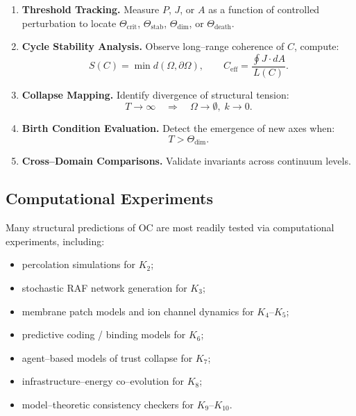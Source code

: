 \begin{enumerate}
    \item \textbf{Threshold Tracking.}
          Measure $P$, $J$, or $A$ as a function of controlled perturbation to
          locate $\Theta_{\mathrm{crit}}$, $\Theta_{\mathrm{stab}}$,
          $\Theta_{\mathrm{dim}}$, or $\Theta_{\mathrm{death}}$.

    \item \textbf{Cycle Stability Analysis.}
          Observe long–range coherence of $C$, compute:
          \[
             S(C)=\min d(\Omega,\partial\Omega),\qquad
             C_{\mathrm{eff}}=\frac{\oint J\cdot dA}{L(C)}.
          \]

    \item \textbf{Collapse Mapping.}
          Identify divergence of structural tension:
          \[
              T\to \infty \quad \Rightarrow \quad
              \Omega\to\emptyset, \; k\to 0.
          \]

    \item \textbf{Birth Condition Evaluation.}
          Detect the emergence of new axes when:
          \[
             T > \Theta_{\mathrm{dim}}.
          \]

    \item \textbf{Cross–Domain Comparisons.}
          Validate invariants across continuum levels.
\end{enumerate}


\subsection{Computational Experiments}

Many structural predictions of OC are most readily tested via computational
experiments, including:

\begin{itemize}
    \item percolation simulations for $K_2$;
    \item stochastic RAF network generation for $K_3$;
    \item membrane patch models and ion channel dynamics for $K_4$–$K_5$;
    \item predictive coding / binding models for $K_6$;
    \item agent–based models of trust collapse for $K_7$;
    \item infrastructure–energy co–evolution for $K_8$;
    \item model–theoretic consistency checkers for $K_9$–$K_{10}$.
\end{itemize}

